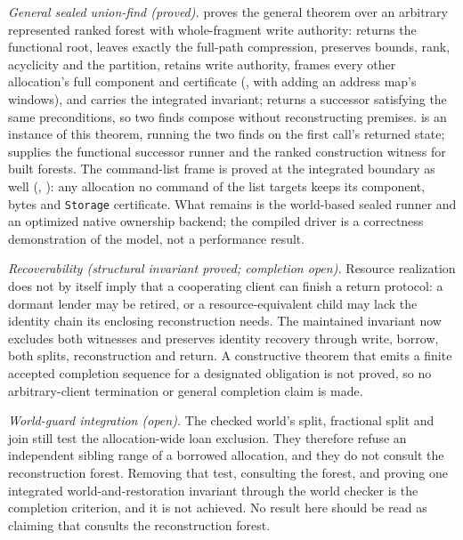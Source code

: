 \documentclass[a4paper,UKenglish,cleveref]{lipics-v2021}
\begin{document}
\emph{General sealed union-find (proved).}  proves the
general theorem over an arbitrary represented ranked forest with whole-fragment
write authority:  returns the functional root, leaves
exactly the full-path compression, preserves bounds, rank, acyclicity and the
partition, retains write authority, frames every other allocation's full
component and  certificate (, with
 adding an address map's windows), and carries the
integrated invariant;  returns a successor satisfying the
same preconditions, so two finds compose without reconstructing premises.
 is an instance of this theorem, running the two finds
on the first call's returned state;  supplies the
functional successor runner and  the ranked construction
witness for built forests. The command-list frame is proved at the integrated
boundary as well (, ):
any allocation no command of the list targets keeps its component, bytes and
\texttt{Storage} certificate. What remains is the world-based sealed runner and
an optimized native ownership backend; the compiled  driver is a
correctness demonstration of the model, not a performance result.

\emph{Recoverability (structural invariant proved; completion open).} Resource
realization does not by itself imply that a cooperating client can finish a
return protocol: a dormant lender may be retired, or a resource-equivalent child
may lack the identity chain its enclosing reconstruction needs. The maintained
invariant now excludes both witnesses and preserves identity recovery through
write, borrow, both splits, reconstruction and return. A constructive theorem
that emits a finite accepted completion sequence for a designated obligation is
not proved, so no arbitrary-client termination or general completion claim is
made.

\emph{World-guard integration (open).} The checked world's split, fractional
split and join still test the allocation-wide loan exclusion. They therefore
refuse an independent sibling range of a borrowed allocation, and they do not
consult the reconstruction forest. Removing that test, consulting the forest,
and proving one integrated world-and-restoration invariant through the world
checker is the completion criterion, and it is not
achieved. No result here should be read as claiming that
 consults the reconstruction forest.
\end{document}
